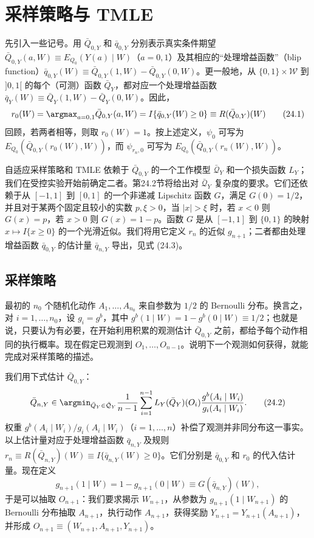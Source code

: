 \section{采样策略与 TMLE}

先引入一些记号。用 $\bar Q_{0,Y}$ 和 $\bar q_{0,Y}$ 分别表示真实条件期望 $\bar Q_{0,Y}(a,W)\equiv E_{Q_0}(Y(a)\mid W)$（$a=0,1$）及其相应的“处理增益函数”（blip function）$\bar q_{0,Y}(W)\equiv\bar Q_{0,Y}(1,W)-\bar Q_{0,Y}(0,W)$。更一般地，从 $\{0,1\}\times\mathcal W$ 到 $]0,1[$ 的每个（可测）函数 $\bar Q_Y$，都对应一个处理增益函数 $\bar q_Y(W)\equiv\bar Q_Y(1,W)-\bar Q_Y(0,W)$。因此，
\begin{equation}
 r_0(W)=\argmax_{a=0,1}\bar Q_{0,Y}(a,W)
 =I\{\bar q_{0,Y}(W)\geq0\}\equiv R(\bar Q_{0,Y})(W)
 \tag{24.1}
\end{equation}
回顾，若两者相等，则取 $r_0(W)=1$。按上述定义，$\psi_0$ 可写为 $E_{Q_0}(\bar Q_{0,Y}(r_0(W),W))$，而 $\psi_{r_n,0}$ 可写为 $E_{Q_0}(\bar Q_{0,Y}(r_n(W),W))$。

自适应采样策略和 TMLE 依赖于 $\bar Q_{0,Y}$ 的一个工作模型 $\bar{\mathcal Q}_Y$ 和一个损失函数 $L_Y$；我们在受控实验开始前确定二者。第24.2节将给出对 $\bar{\mathcal Q}_Y$ 复杂度的要求。它们还依赖于从 $[-1,1]$ 到 $[0,1]$ 的一个非递减 Lipschitz 函数 $G$，满足 $G(0)=1/2$，并且对于某两个固定且较小的实数 $p,\xi>0$，当 $|x|>\xi$ 时，若 $x<0$ 则 $G(x)=p$，若 $x>0$ 则 $G(x)=1-p$。函数 $G$ 是从 $[-1,1]$ 到 $\{0,1\}$ 的映射 $x\mapsto I\{x\geq0\}$ 的一个光滑近似。我们将用它定义 $r_n$ 的近似 $g_{n+1}$；二者都由处理增益函数 $\bar q_{0,Y}$ 的估计量 $\bar q_{n,Y}$ 导出，见式 (24.3)。

\subsection{采样策略}

最初的 $n_0$ 个随机化动作 $A_1,\ldots,A_{n_0}$ 来自参数为 $1/2$ 的 Bernoulli 分布。换言之，对 $i=1,\ldots,n_0$，设 $g_i=g^b$，其中 $g^b(1\mid W)=1-g^b(0\mid W)\equiv1/2$；也就是说，只要认为有必要，在开始利用积累的观测估计 $\bar Q_{0,Y}$ 之前，都给予每个动作相同的执行概率。现在假定已观测到 $O_1,\ldots,O_{n-1}$。说明下一个观测如何获得，就能完成对采样策略的描述。

我们用下式估计 $\bar Q_{0,Y}$：
\begin{equation}
 \bar Q_{n,Y}\in\argmin_{\bar Q_Y\in\bar{\mathcal Q}_Y}
 \frac1{n-1}\sum_{i=1}^{n-1}L_Y(\bar Q_Y)(O_i)
 \frac{g^b(A_i\mid W_i)}{g_i(A_i\mid W_i)}.
 \tag{24.2}
\end{equation}
权重 $g^b(A_i\mid W_i)/g_i(A_i\mid W_i)$（$i=1,\ldots,n$）补偿了观测并非同分布这一事实。以上估计量对应于处理增益函数 $\bar q_{n,Y}$ 及规则 $r_n\equiv R(\bar Q_{n,Y})(W)\equiv I\{\bar q_{n,Y}(W)\geq0\}$。它们分别是 $\bar q_{0,Y}$ 和 $r_0$ 的代入估计量。现在定义
\begin{equation}
 g_{n+1}(1\mid W)=1-g_{n+1}(0\mid W)\equiv G(\bar q_{n,Y})(W),
 \tag{24.3}
\end{equation}
于是可以抽取 $O_{n+1}$：我们要求揭示 $W_{n+1}$，从参数为 $g_{n+1}(1\mid W_{n+1})$ 的 Bernoulli 分布抽取 $A_{n+1}$，执行动作 $A_{n+1}$，获得奖励 $Y_{n+1}=Y_{n+1}(A_{n+1})$，并形成 $O_{n+1}\equiv(W_{n+1},A_{n+1},Y_{n+1})$。

